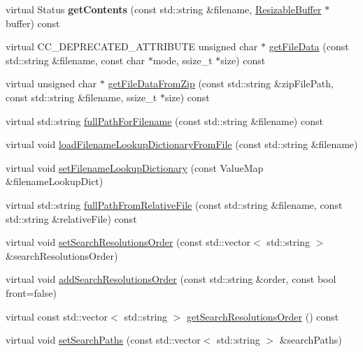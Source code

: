 \begin{DoxyCompactItemize}
\item 
\mbox{\label{classFileUtils_a2ac9b9ef4ca3dbc05bfa09410b36aa9d}} 
virtual Status {\bfseries get\+Contents} (const std\+::string \&filename, \hyperlink{classResizableBuffer}{Resizable\+Buffer} $\ast$buffer) const
\item 
virtual C\+C\+\_\+\+D\+E\+P\+R\+E\+C\+A\+T\+E\+D\+\_\+\+A\+T\+T\+R\+I\+B\+U\+TE unsigned char $\ast$ \hyperlink{classFileUtils_a895b2f0b05b3163dcf18aaf456bbe46e}{get\+File\+Data} (const std\+::string \&filename, const char $\ast$mode, ssize\+\_\+t $\ast$size) const
\item 
virtual unsigned char $\ast$ \hyperlink{classFileUtils_a9d3d28064945c8410b6fd0927f8e894a}{get\+File\+Data\+From\+Zip} (const std\+::string \&zip\+File\+Path, const std\+::string \&filename, ssize\+\_\+t $\ast$size) const
\item 
virtual std\+::string \hyperlink{classFileUtils_a06e56ef12b5ec5c7d11c138484f111bf}{full\+Path\+For\+Filename} (const std\+::string \&filename) const
\item 
virtual void \hyperlink{classFileUtils_ae8308c3d358c44312b6d804287dad1b7}{load\+Filename\+Lookup\+Dictionary\+From\+File} (const std\+::string \&filename)
\item 
virtual void \hyperlink{classFileUtils_a8039a26b5d8e3b29dfc8ad01104e966c}{set\+Filename\+Lookup\+Dictionary} (const Value\+Map \&filename\+Lookup\+Dict)
\item 
virtual std\+::string \hyperlink{classFileUtils_abc1dbf1656599ede5f15347c3fcedb85}{full\+Path\+From\+Relative\+File} (const std\+::string \&filename, const std\+::string \&relative\+File) const
\item 
virtual void \hyperlink{classFileUtils_ae9c17f012420d7acc993503c5596bf7f}{set\+Search\+Resolutions\+Order} (const std\+::vector$<$ std\+::string $>$ \&search\+Resolutions\+Order)
\item 
virtual void \hyperlink{classFileUtils_a9fd27cac8efc54927ced6fb1b5f9f657}{add\+Search\+Resolutions\+Order} (const std\+::string \&order, const bool front=false)
\item 
virtual const std\+::vector$<$ std\+::string $>$ \hyperlink{classFileUtils_a3f1af62189d1c9f5fc944d38fc6265a6}{get\+Search\+Resolutions\+Order} () const
\item 
virtual void \hyperlink{classFileUtils_a40bd3826a4e4f49706179fc5e009a462}{set\+Search\+Paths} (const std\+::vector$<$ std\+::string $>$ \&search\+Paths)
\item 

\end{DoxyCompactItemize}
